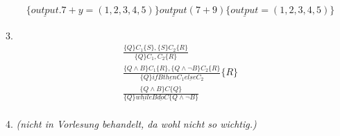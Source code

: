 \begin{compactitem}
\begin{align*}
		\end{align*}
		\begin{align*}
		\{\underline{output}.7+y=(1,2,3,4,5)\} \underline{output} (7+9) \{\underline{output} = (1,2,3,4,5)\}
		\end{align*}
	\item[3.]
	\begin{align}
	\frac{\{Q\}C_1\{S\},\{S\}C_2\{R\}}{\{Q\}C_1,C_2\{R\}}\tag{A.5}\\
	\frac{\{Q\land B\}C_1\{R\},\{Q\land \lnot B\}C_2\{R\}}{\{Q\}\underline{if}B\underline{then}C_1\underline{else}C_2}\{R\}\tag{A.6}\\
	\frac{\{Q\land B\}C\{Q\}}{\{Q\}\underline{while}B\underline{do}C\{Q\land \lnot B\}}\tag{A.7}\\
	\end{align}
	\item[4.] \emph{(nicht in Vorlesung behandelt, da wohl nicht so wichtig.)}
\end{compactitem}
\begin{compactitem}

\end{compactitem}
